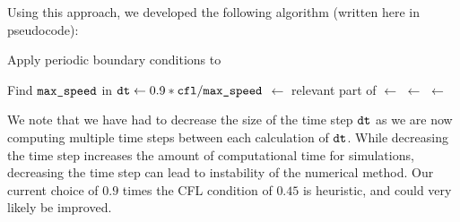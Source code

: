 Using this approach, we developed the following algorithm (written here in pseudocode):

\begin{algorithm}
\begin{algorithmic}[1]
\item Apply periodic boundary conditions to 
\item Find $\texttt{max\_speed}$ in 
\State $\texttt{dt} \gets 0.9*\texttt{cfl} / \texttt{max\_speed}$
	\State {} $\gets$ relevant part of 
		\State {} $\gets$  
		\State {} $\gets$ 
	\EndFor
	\State {} $\gets$ 
\EndFor
\end{algorithmic}
\end{algorithm}

We note that we have had to decrease the size of the time step $\texttt{dt}$ as we are now computing multiple time steps between each calculation of $\texttt{dt}$. While decreasing the time step increases the amount of computational time for simulations, decreasing the time step can lead to instability of the numerical method. Our current choice of $0.9$ times the CFL condition of $0.45$ is heuristic, and could very likely be improved.